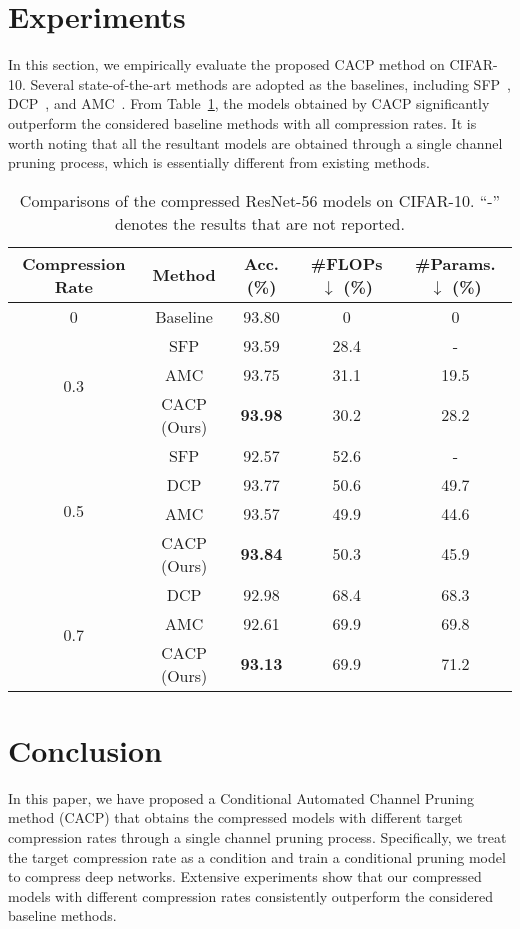 \documentclass[letterpaper]{article} %
\begin{document}
\section{Experiments}
In this section, we empirically evaluate the proposed CACP method on CIFAR-10. Several state-of-the-art methods
are adopted as the baselines, including
SFP~\cite{he2018soft}, DCP~\cite{zhuang2018discrimination}, and AMC~\cite{he2018amc}. 
From Table~\ref{cmac_acc}, the models obtained by CACP significantly outperform the considered baseline methods with all compression rates. It is worth noting that all the resultant models are obtained through a single channel pruning process, which is essentially different from existing methods. 
\begin{table}[h]
\centering
\caption{Comparisons of the compressed ResNet-56 models on CIFAR-10. ``-'' denotes the results that are not reported.}
\label{cmac_acc}
\resizebox{1\linewidth}{!}
{
\begin{tabular}{c|c|c|c|c}
\toprule
Compression Rate      & Method              & Acc. (\%) & \#FLOPs $\downarrow$ (\%)  & \#Params. $\downarrow$ (\%)   \\ \hline
0 & Baseline & 93.80 & 0 & 0 \\
\hline
\multirow{3}{*}{0.3} 
& SFP  &         93.59  &  28.4  &  - \\ 
& AMC                 &     93.75          &  31.1 & 19.5 \\ 
& {CACP (Ours)} &      \textbf{93.98}      & 30.2 & 28.2\\ 
\hline
\multirow{4}{*}{0.5}  
& SFP                 &         92.57     &  52.6 & -  \\ 
& DCP &     93.77       &  50.6  & 49.7   \\ 
& AMC                 &     93.57        &  49.9 & 44.6  \\ 
& {CACP (Ours)} &    \textbf{93.84}    & 50.3 &  45.9 \\ 
\hline
\multirow{3}{*}{0.7} & DCP &     92.98       &  68.4  & 68.3    \\ 
& AMC                 &      92.61      &   69.9 &   69.8\\ 
& {CACP (Ours)} &   \textbf{93.13}    &  69.9  &   71.2 \\ 
\bottomrule
\end{tabular}
}
\end{table}
\section{Conclusion}
In this paper, we have proposed a Conditional Automated Channel Pruning method (CACP) that obtains the compressed models with different target compression rates through a single channel pruning process. Specifically, we treat the target compression rate as a condition and train a conditional pruning model to compress deep networks. Extensive experiments show that our compressed models with different compression rates consistently outperform the considered baseline methods. 

\bigskip
\end{document}
